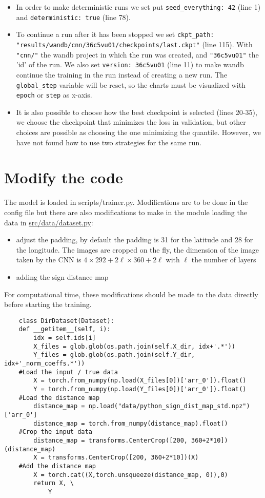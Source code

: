 \documentclass[11pt]{article}
\begin{document}
\begin{itemize}
\item In order to make deterministic runs we set put \texttt{seed\_everything: 42} (line 1) and \texttt{deterministic: true} (line 78).
\item To continue a run after it has been stopped we set  \texttt{ckpt\_path: "results/wandb/cnn/36c5vu01/checkpoints/last.ckpt"} (line 115). With \texttt{"cnn/"} the wandb project in which the run was created, and \texttt{"36c5vu01"} the 'id' of the run. We also set \texttt{version: 36c5vu01} (line 11) to make wandb continue the training in the run instead of creating a new run. The \texttt{global\_step} variable will be reset, so the charts must be visualized with \texttt{epoch} or \texttt{step} as x-axis.
\item It is also possible to choose how the best checkpoint is selected (lines 20-35), we choose the checkpoint that minimizes the loss in validation, but other choices are possible as choosing the one minimizing the quantile. However, we have not found how to use two strategies for the same run.
\end{itemize}
\section{Modify the code}
\label{sec:orgbe29006}
\label{sec:modify}
The model is loaded in scripts/trainer.py. Modifications are to be done in the config file but there are also modifications to make in the module loading the data in \url{src/data/dataset.py}:
\begin{itemize}
\item adjust the padding, by default the padding is 31 for the latitude and 28 for the longitude. The images are cropped on the fly, the dimension of the image taken by the CNN is \(4 \times 292+2\ell \times 360 + 2\ell\) with \(\ell\) the number of layers
\item adding the sign distance map
\end{itemize}
For computational time, these modifications should be made to the data directly before starting the training.

\begin{verbatim}
    class DirDataset(Dataset):
    def __getitem__(self, i):
        idx = self.ids[i]
        X_files = glob.glob(os.path.join(self.X_dir, idx+'.*'))
        Y_files = glob.glob(os.path.join(self.Y_dir, idx+'_norm_coeffs.*'))
    #Load the input / true data
        X = torch.from_numpy(np.load(X_files[0])['arr_0']).float()
        Y = torch.from_numpy(np.load(Y_files[0])['arr_0']).float()
    #Load the distance map
        distance_map = np.load("data/python_sign_dist_map_std.npz")['arr_0']
        distance_map = torch.from_numpy(distance_map).float()
    #Crop the input data
        distance_map = transforms.CenterCrop([200, 360+2*10])(distance_map)
        X = transforms.CenterCrop([200, 360+2*10])(X)
    #Add the distance map
        X = torch.cat((X,torch.unsqueeze(distance_map, 0)),0)
        return X, \
            Y
\end{verbatim}
\end{document}
